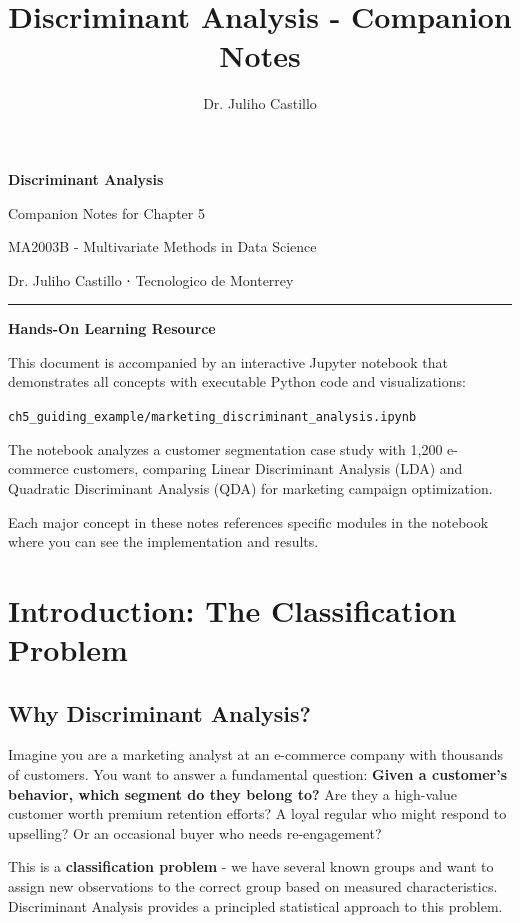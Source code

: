 \documentclass[
]{article}
\title{Discriminant Analysis - Companion Notes}
\author{Dr. Juliho Castillo}
\date{}
\begin{document}
\maketitle

\textbf{Discriminant Analysis}

Companion Notes for Chapter 5

MA2003B - Multivariate Methods in Data Science

Dr. Juliho Castillo ⋅ Tecnologico de Monterrey

\begin{center}\rule{0.5\linewidth}{0.5pt}\end{center}

\textbf{Hands-On Learning Resource}

This document is accompanied by an interactive Jupyter notebook that
demonstrates all concepts with executable Python code and
visualizations:

\texttt{ch5\_guiding\_example/marketing\_discriminant\_analysis.ipynb}

The notebook analyzes a customer segmentation case study with 1,200
e-commerce customers, comparing Linear Discriminant Analysis (LDA) and
Quadratic Discriminant Analysis (QDA) for marketing campaign
optimization.

Each major concept in these notes references specific modules in the
notebook where you can see the implementation and results.

\section{Introduction: The Classification Problem}

\subsection{Why Discriminant Analysis?}

Imagine you are a marketing analyst at an e-commerce company with
thousands of customers. You want to answer a fundamental question:
\textbf{Given a customer's behavior, which segment do they belong to?}
Are they a high-value customer worth premium retention efforts? A loyal
regular who might respond to upselling? Or an occasional buyer who needs
re-engagement?

This is a \textbf{classification problem} - we have several known groups
and want to assign new observations to the correct group based on
measured characteristics. Discriminant Analysis provides a principled
statistical approach to this problem.
\end{document}
